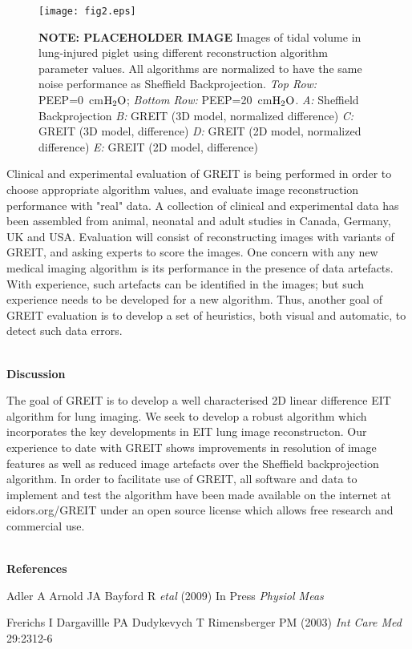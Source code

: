 \documentclass[12pt]{article}
\newcommand{\mysection}[1]{
~\\ \noindent
{\bf \normalsize #1}
\vspace{1mm}
}
\begin{document}
\vspace{-6mm}
\begin{figure}[htp]
\centering
\texttt{[image: fig2.eps]}
\vspace{-4mm}
\caption{%
\small
{\bf NOTE: PLACEHOLDER IMAGE}
Images of tidal volume in lung-injured piglet
\cite{frerichs03} using different reconstruction
algorithm parameter values. All algorithms are normalized to have
the same noise performance as Sheffield Backprojection.
{\em Top Row:} P{\footnotesize EEP=}0~cm$\rm H_{2}O$;
{\em Bottom Row:} P{\footnotesize EEP=}20~cm$\rm H_{2}O$.
{\em A:} Sheffield Backprojection
{\em B:} GREIT (3D model, normalized difference)
{\em C:} GREIT (3D model, difference)
{\em D:} GREIT (2D model, normalized difference)
{\em E:} GREIT (2D model, difference)
}
\label{fig:figbackgnd}
\end{figure}

Clinical and experimental evaluation of GREIT is being
performed in order to choose appropriate algorithm values,
and evaluate image reconstruction performance with "real"
data. A collection of clinical and experimental data has
been assembled from animal, neonatal  and adult studies
in Canada, Germany, UK and USA. Evaluation will consist
of reconstructing images with variants of GREIT, and
asking experts to score the images.  One concern with any
new medical imaging algorithm is its performance in the
presence of data artefacts. With experience, such artefacts
can be identified in the images; but such experience needs
to be developed for a new algorithm.  Thus, another goal
of GREIT evaluation is to develop a set of heuristics,
both visual and automatic, to detect such data errors.


\vspace{-3mm}
\mysection{Discussion}

The goal of GREIT is to develop a well characterised 2D
linear difference EIT algorithm for lung imaging. We seek to develop
a robust algorithm which incorporates the key developments
in EIT lung image reconstructon. Our experience to date
with GREIT shows improvements in resolution of image features
as well as reduced image artefacts over the Sheffield backprojection
algorithm. In order to facilitate use of GREIT,
all software
and data to implement and test the algorithm have been
made available on the internet at eidors.org/GREIT under
an open source license which allows free research and
commercial use.

\mysection{References}
\begin{thebibliography}{9}
\setlength{\itemsep}{-2mm}
\vspace{-1.8cm}
Adler A  Arnold JA Bayford R {\em etal} (2009)
In Press {\em Physiol Meas}

Frerichs I Dargavillle PA Dudykevych T Rimensberger PM (2003) 
{\em Int Care Med} 29:2312-6

\end{thebibliography}
\end{document}
